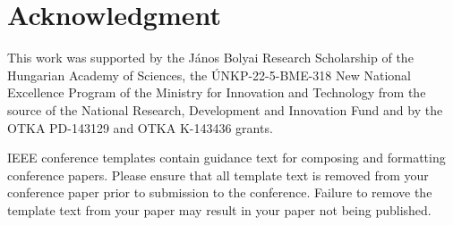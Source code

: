 \documentclass[conference]{IEEEtran}
\begin{document}
\section*{Acknowledgment}

This work was supported by the János Bolyai Research Scholarship of the Hungarian Academy of Sciences, the ÚNKP-22-5-BME-318 New National Excellence Program of the Ministry for Innovation and Technology from the source of the National Research, Development and Innovation Fund
and by the OTKA PD-143129 and OTKA K-143436 grants.



\vspace{12pt}
\color{red}
IEEE conference templates contain guidance text for composing and formatting conference papers. Please ensure that all template text is removed from your conference paper prior to submission to the conference. Failure to remove the template text from your paper may result in your paper not being published.
\end{document}
